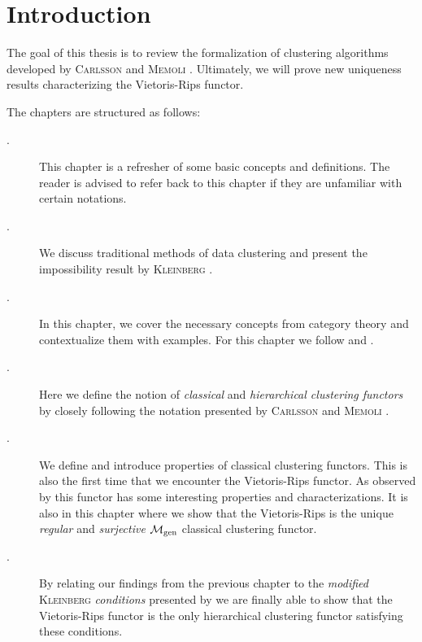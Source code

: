 \chapter*{Introduction}

The goal of this thesis is to review the formalization of clustering algorithms developed by \textsc{Carlsson} and \textsc{Memoli} \cite{Carlsson2010}. Ultimately, we will prove new uniqueness results characterizing the Vietoris-Rips functor.

The chapters are structured as follows:
\begin{description}
    \item[.] This chapter is a refresher of some basic concepts and definitions. The reader is advised to refer back to this chapter if they are unfamiliar with certain notations.

    \item[.] We discuss traditional methods of data clustering and present the impossibility result by \textsc{Kleinberg} \cite{Kleinberg2002}.

    \item[.] In this chapter, we cover the necessary concepts from category theory and contextualize them with examples. For this chapter we follow \cite{Roman2017} and \cite{Leinster2014-dc}.

    \item[.] Here we define the notion of \emph{classical} and \emph{hierarchical clustering functors} by closely following the notation presented by \textsc{Carlsson} and \textsc{Memoli} \cite{Carlsson2010}.

    \item[.] We define and introduce properties of classical clustering functors. This is also the first time that we encounter the Vietoris-Rips functor. As observed by \cite{Carlsson2010} this functor has some interesting properties and characterizations. It is also in this chapter where we show that the Vietoris-Rips is the unique \emph{regular} and \emph{surjective} ${\mathcal{M}_\mathrm{gen}}$ classical clustering functor.

    \item[.] By relating our findings from the previous chapter to the \emph{modified} \textsc{Kleinberg} \emph{conditions} presented by \cite[Sec.~7.3.1]{Carlsson2010} we are finally able to show that the Vietoris-Rips functor is the only hierarchical clustering functor satisfying these conditions.
\end{description}